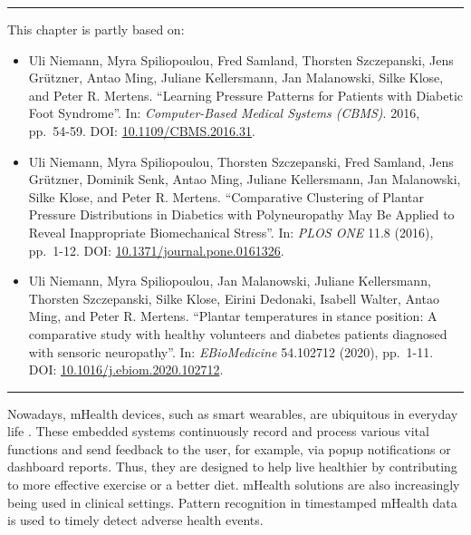 \documentclass[
  oneside]{book}
\providecommand{\tightlist}{%
  \setlength{\itemsep}{0pt}\setlength{\parskip}{0pt}}
\newenvironment{lit}
  {
  \vspace{8pt}
  \hrule
  \vspace{8pt}
  }
  {
  \vspace{8pt}
  \hrule
  \vspace{8pt}
  }
\begin{document}
\begin{lit}

This chapter is partly based on:

\begin{itemize}
\tightlist
\item
  Uli Niemann, Myra Spiliopoulou, Fred Samland, Thorsten Szczepanski, Jens Grützner, Antao Ming, Juliane Kellersmann, Jan Malanowski, Silke Klose, and Peter R. Mertens. ``Learning Pressure Patterns for Patients with Diabetic Foot Syndrome''. In: \emph{Computer-Based Medical Systems (CBMS)}. 2016, pp.~54-59. DOI: \href{https://doi.org/10.1109\%2FCBMS.2016.31}{10.1109/CBMS.2016.31}.
\item
  Uli Niemann, Myra Spiliopoulou, Thorsten Szczepanski, Fred Samland, Jens Grützner, Dominik Senk, Antao Ming, Juliane Kellersmann, Jan Malanowski, Silke Klose, and Peter R. Mertens. ``Comparative Clustering of Plantar Pressure Distributions in Diabetics with Polyneuropathy May Be Applied to Reveal Inappropriate Biomechanical Stress''. In: \emph{PLOS ONE} 11.8 (2016), pp.~1-12. DOI: \href{https://doi.org/10.1371\%2Fjournal.pone.0161326}{10.1371/journal.pone.0161326}.
\item
  Uli Niemann, Myra Spiliopoulou, Jan Malanowski, Juliane Kellersmann, Thorsten Szczepanski, Silke Klose, Eirini Dedonaki, Isabell Walter, Antao Ming, and Peter R. Mertens. ``Plantar temperatures in stance position: A comparative study with healthy volunteers and diabetes patients diagnosed with sensoric neuropathy''. In: \emph{EBioMedicine} 54.102712 (2020), pp.~1-11. DOI: \href{https://doi.org/10.1016\%2Fj.ebiom.2020.102712}{10.1016/j.ebiom.2020.102712}.
\end{itemize}

\end{lit}

Nowadays, mHealth devices, such as smart wearables, are ubiquitous in everyday life \autocite{gerhardt2018mhealth}.
These embedded systems continuously record and process various vital functions and send feedback to the user, for example, via popup notifications or dashboard reports.
Thus, they are designed to help live healthier by contributing to more effective exercise or a better diet.
mHealth solutions are also increasingly being used in clinical settings.
Pattern recognition in timestamped mHealth data is used to timely detect adverse health events.
\end{document}
